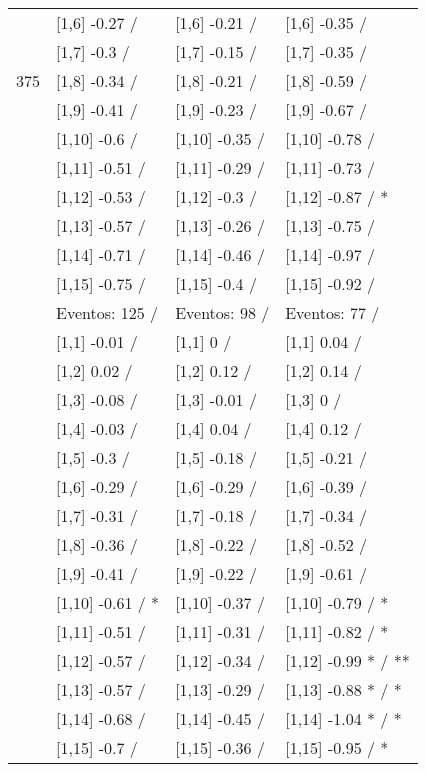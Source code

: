 \begin{table}
\begin{tabular}[t]{llll}
 & {}[1,6] -0.27  / & {}[1,6] -0.21  / & {}[1,6] -0.35  /\\
 & {}[1,7] -0.3  / & {}[1,7] -0.15  / & {}[1,7] -0.35  /\\
375 & {}[1,8] -0.34  / & {}[1,8] -0.21  / & {}[1,8] -0.59  /\\
\addlinespace
 & {}[1,9] -0.41  / & {}[1,9] -0.23  / & {}[1,9] -0.67  /\\
 & {}[1,10] -0.6  / & {}[1,10] -0.35  / & {}[1,10] -0.78  /\\
 & {}[1,11] -0.51  / & {}[1,11] -0.29  / & {}[1,11] -0.73  /\\
 & {}[1,12] -0.53  / & {}[1,12] -0.3  / & {}[1,12] -0.87  / *\\
 & {}[1,13] -0.57  / & {}[1,13] -0.26  / & {}[1,13] -0.75  /\\
\addlinespace
 & {}[1,14] -0.71  / & {}[1,14] -0.46  / & {}[1,14] -0.97  /\\
 & {}[1,15] -0.75  / & {}[1,15] -0.4  / & {}[1,15] -0.92  /\\
 & Eventos:  125 / & Eventos:  98 / & Eventos:  77 /\\
 & {}[1,1] -0.01  / & {}[1,1] 0  / & {}[1,1] 0.04  /\\
 & {}[1,2] 0.02  / & {}[1,2] 0.12  / & {}[1,2] 0.14  /\\
\addlinespace
 & {}[1,3] -0.08  / & {}[1,3] -0.01  / & {}[1,3] 0  /\\
 & {}[1,4] -0.03  / & {}[1,4] 0.04  / & {}[1,4] 0.12  /\\
 & {}[1,5] -0.3  / & {}[1,5] -0.18  / & {}[1,5] -0.21  /\\
 & {}[1,6] -0.29  / & {}[1,6] -0.29  / & {}[1,6] -0.39  /\\
 & {}[1,7] -0.31  / & {}[1,7] -0.18  / & {}[1,7] -0.34  /\\
\addlinespace
500 & {}[1,8] -0.36  / & {}[1,8] -0.22  / & {}[1,8] -0.52  /\\
 & {}[1,9] -0.41  / & {}[1,9] -0.22  / & {}[1,9] -0.61  /\\
 & {}[1,10] -0.61  / * & {}[1,10] -0.37  / & {}[1,10] -0.79  / *\\
 & {}[1,11] -0.51  / & {}[1,11] -0.31  / & {}[1,11] -0.82  / *\\
 & {}[1,12] -0.57  / & {}[1,12] -0.34  / & {}[1,12] -0.99 * / **\\
\addlinespace
 & {}[1,13] -0.57  / & {}[1,13] -0.29  / & {}[1,13] -0.88 * / *\\
 & {}[1,14] -0.68  / & {}[1,14] -0.45  / & {}[1,14] -1.04 * / *\\
 & {}[1,15] -0.7  / & {}[1,15] -0.36  / & {}[1,15] -0.95  / *\\
\bottomrule
\end{tabular}
\end{table}
